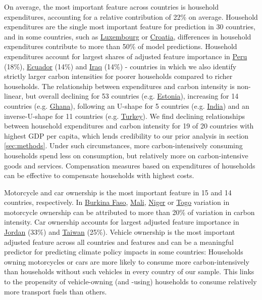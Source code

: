 \documentclass[12pt, a4paper]{article}
\begin{document}
On average, the most important feature across countries is household expenditures, accounting for a relative contribution of 22\% on average. Household expenditures are the single most important feature for prediction in 30 countries, and in some countries, such as \hyperref[fig:5b_LUX]{Luxembourg} or \hyperref[fig:5b_HRV]{Croatia}, differences in household expenditures contribute to more than 50\% of model predictions. Household expenditures account for largest shares of adjusted feature importance in \hyperref[fig:5b_PER]{Peru} (18\%), \hyperref[fig:5b_ECU]{Ecuador} (14\%) and \hyperref[fig:5b_IRQ]{Iraq} (14\%) - countries in which we also identify strictly larger carbon intensities for poorer households compared to richer households. The relationship between expenditures and carbon intensity is non-linear, but overall declining for 53 countries (e.g. \hyperref[fig:5b_EST]{Estonia}), increasing for 14 countries (e.g. \hyperref[fig:5b_GHA]{Ghana}), following an U-shape for 5 countries (e.g. \hyperref[fig:5b_IND]{India}) and an inverse-U-shape for 11 countries (e.g. \hyperref[fig:5b_TUR]{Turkey}). We find declining relationships between household expenditures and carbon intensity for 19 of 20 countries with highest GDP per capita, which lends credibility to our prior analysis in section \ref{sec:methods}. Under such circumstances, more carbon-intensively consuming households spend less on consumption, but relatively more on carbon-intensive goods and services. Compensation measures based on expenditures of households can be effective to compensate households with highest costs.

Motorcycle and car ownership is the most important feature in 15 and 14 countries, respectively. In \hyperref[fig:5b_BFA]{Burkina Faso}, \hyperref[fig:5b_MLI]{Mali}, \hyperref[fig:5b_NER]{Niger} or \hyperref[fig:5b_TGO]{Togo} variation in motorcycle ownership can be attributed to more than 20\% of variation in carbon intensity. Car ownership accounts for largest adjusted feature importance in \hyperref[fig:5b_JOR]{Jordan} (33\%) and \hyperref[fig:5b_TWN]{Taiwan} (25\%). Vehicle ownership is the most important adjusted feature across all countries and features and can be a meaningful predictor for predicting climate policy impacts in some countries: Households owning motorcycles or cars are more likely to consume more carbon-intensively than households without such vehicles in every country of our sample. This links to the propensity of vehicle-owning (and -using) households to consume relatively more transport fuels than others.
\end{document}
